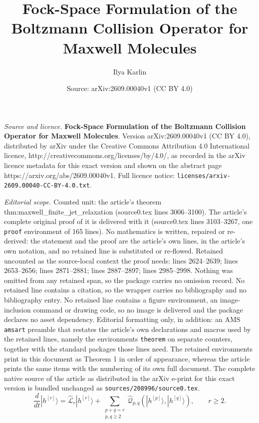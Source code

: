 \documentclass[10pt,a4paper]{amsart}
\title{\textbf{Fock-Space Formulation of the Boltzmann Collision Operator for Maxwell Molecules}}
\author{Ilya Karlin}
\date{Source: arXiv:2609.00040v1 (CC BY 4.0)}
\begin{document}
\maketitle

\noindent\emph{Source and licence.} \textbf{Fock-Space Formulation of the Boltzmann Collision Operator for Maxwell Molecules}. Version arXiv:2609.00040v1 (CC BY 4.0), distributed by arXiv under the Creative Commons Attribution 4.0 International licence, http://creativecommons.org/licenses/by/4.0/, as recorded in the arXiv licence metadata for this exact version and shown on the abstract page https://arxiv.org/abs/2609.00040v1. Full licence notice: \texttt{licenses/arxiv-2609.00040-CC-BY-4.0.txt}.\par\smallskip

\noindent\textit{Editorial scope.} Counted unit: the article's theorem thm:maxwell\_finite\_jet\_relaxation (source0.tex lines 3006--3100). The article's complete original proof of it is delivered with it (source0.tex lines 3103--3267, one \texttt{proof} environment of 165 lines). No mathematics is written, repaired or re-derived: the statement and the proof are the article's own lines, in the article's own notation, and no retained line is substituted or re-flowed.  Retained uncounted as the source-local context the proof needs: lines 2624--2639; lines 2653--2656; lines 2871--2881; lines 2887--2897; lines 2985--2998.  Nothing was omitted from any retained span, so the package carries no omission record.  No retained line contains a citation, so the wrapper carries no bibliography and no bibliography entry.  No retained line contains a figure environment, an image-inclusion command or drawing code, so no image is delivered and the package declares no asset dependency.  Editorial formatting only, in addition: an AMS \texttt{amsart} preamble that restates the article's own declarations and macros used by the retained lines, namely the environments \texttt{theorem} on separate counters, together with the standard packages those lines need.  The retained environments print in this document as Theorem 1 in order of appearance, whereas the article prints the same items with the numbering of its own full document.  The complete native source of the article as distributed in the arXiv e-print for this exact version is bundled unchanged as \texttt{sources/208996/source0.tex}.
\begin{equation}
\boxed{
\frac{d}{dt}|h^{[r]}\rangle
=
\widehat{\mathcal L}_r|h^{[r]}\rangle
+
\sum_{\substack{p+q=r\\p,q\geq2}}
\widehat{\mathcal Q}_{p,q}
\left(
|h^{[p]}\rangle,
|h^{[q]}\rangle
\right),
\qquad r\geq2.
}
\label{eq:maxwell_jet_exact_triangular_hierarchy}
\end{equation}
\end{document}
